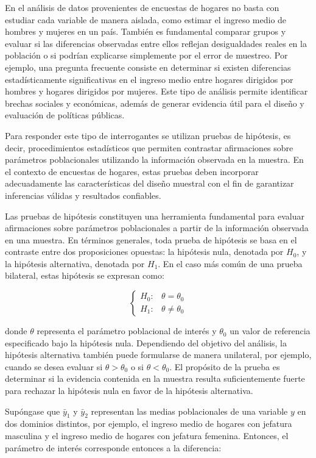\documentclass[
  spanish,
  12pt,
]{book}
\begin{document}
En el análisis de datos provenientes de encuestas de hogares no basta con estudiar cada variable de manera aislada, como estimar el ingreso medio de hombres y mujeres en un país. También es fundamental comparar grupos y evaluar si las diferencias observadas entre ellos reflejan desigualdades reales en la población o si podrían explicarse simplemente por el error de muestreo. Por ejemplo, una pregunta frecuente consiste en determinar si existen diferencias estadísticamente significativas en el ingreso medio entre hogares dirigidos por hombres y hogares dirigidos por mujeres. Este tipo de análisis permite identificar brechas sociales y económicas, además de generar evidencia útil para el diseño y evaluación de políticas públicas.

Para responder este tipo de interrogantes se utilizan pruebas de hipótesis, es decir, procedimientos estadísticos que permiten contrastar afirmaciones sobre parámetros poblacionales utilizando la información observada en la muestra. En el contexto de encuestas de hogares, estas pruebas deben incorporar adecuadamente las características del diseño muestral con el fin de garantizar inferencias válidas y resultados confiables.

Las pruebas de hipótesis constituyen una herramienta fundamental para evaluar afirmaciones sobre parámetros poblacionales a partir de la información observada en una muestra. En términos generales, toda prueba de hipótesis se basa en el contraste entre dos proposiciones opuestas: la hipótesis nula, denotada por \(H_0\), y la hipótesis alternativa, denotada por \(H_1\). En el caso más común de una prueba bilateral, estas hipótesis se expresan como:

\[
\begin{cases}
H_{0}: & \theta = \theta_0 \\
H_{1}: & \theta \neq \theta_0
\end{cases}
\]

donde \(\theta\) representa el parámetro poblacional de interés y \(\theta_0\) un valor de referencia especificado bajo la hipótesis nula. Dependiendo del objetivo del análisis, la hipótesis alternativa también puede formularse de manera unilateral, por ejemplo, cuando se desea evaluar si \(\theta > \theta_0\) o si \(\theta < \theta_0\). El propósito de la prueba es determinar si la evidencia contenida en la muestra resulta suficientemente fuerte para rechazar la hipótesis nula en favor de la hipótesis alternativa.

Supóngase que \(\bar{y}_1\) y \(\bar{y}_2\) representan las medias poblacionales de una variable \(y\) en dos dominios distintos, por ejemplo, el ingreso medio de hogares con jefatura masculina y el ingreso medio de hogares con jefatura femenina. Entonces, el parámetro de interés corresponde entonces a la diferencia:
\end{document}
